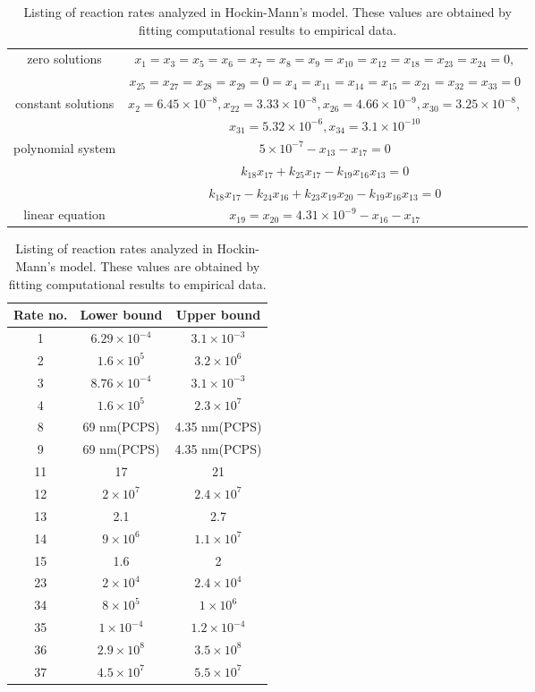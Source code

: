 \begin{table}
\begin{center}
\caption{Steady state solutions by setting free variables in Table
\ref{steady21} to zeros}\label{steady22}\vspace{3mm}
\begin{tabular}{|c|c|}\hline
zero solutions&$x_1=x_3=x_5=x_6=x_7=x_8=x_9=x_{10}=x_{12}=x_{18}=x_{23}=x_{24}=0,$\\
& $x_{25}=x_{27}=x_{28}=x_{29}=0=x_4=x_{11}=
 x_{14}=x_{15}=x_{21}=x_{32}=x_{33}=0$\\\hline
constant solutions&
$x_{2}=6.45\times10^{-8},x_{22}=3.33\times10^{-8},x_{26}=4.66\times10^{-9},x_{30}=3.25\times
10^{-8},$ \\
&$x_{31}=5.32\times10^{-6},x_{34}=3.1\times 10^{-10}$\\\hline
polynomial system &$
5\times10^{-7}-x_{13}-x_{17}=0$\\
&$k_{18}x_{17}+k_{25}x_{17}-k_{19}x_{16}x_{13}=0$\\&$k_{18}x_{17}-k_{24}x_{16}+k_{23}x_{19}x_{20}-k_{19}x_{16}x_{13}=0$\\\hline
linear
equation&$x_{19}=x_{20}=4.31\times10^{-9}-x_{16}-x_{17}$\\\hline
\end{tabular}

\caption{Listing of reaction rates analyzed in Hockin-Mann's model.
These values are obtained by fitting computational results to
empirical data. } \vspace{3mm} \label{reactrate}
\begin{tabular}{|c|c|c|}\hline
Rate no.& Lower bound& Upper bound\\\hline 1& $6.29\times 10^{-4}$&
$3.1\times 10^{-3}$\\\hline 2& $1.6\times 10^{5}$& $3.2\times
10^{6}$\\\hline 3& $8.76\times 10^{-4}$& $3.1\times
10^{-3}$\\\hline4& $1.6\times 10^{5}$& $2.3\times 10^{7}$\\\hline 8&
69 nm(PCPS)& 4.35 nm(PCPS)\\\hline 9& 69 nm(PCPS)& 4.35
nm(PCPS)\\\hline 11& 17 & 21\\\hline
 12&
$2\times 10^7$& $2.4\times 10^7$\\\hline
 13&
2.1& 2.7\\\hline
 14&$9\times10^6$& $1.1\times10^7$\\\hline
 15&1.6& 2\\\hline
 23&$2\times10^4$& $2.4\times10^4$\\\hline
 34&$8\times10^5$& $1\times10^6$\\\hline
  35&$1\times10^{-4}$& $1.2\times10^{-4}$\\\hline
 36&$2.9\times10^8$& $3.5\times10^8$\\\hline
 37&$4.5\times10^7$& $5.5\times10^7$\\\hline
\end{tabular}
\end{center}
\end{table}
